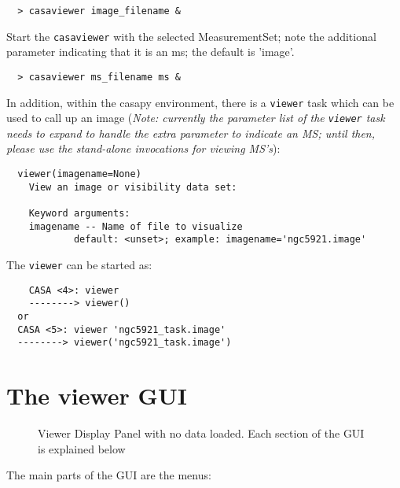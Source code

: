 \small
\begin{verbatim}
  > casaviewer image_filename &
\end{verbatim}
\normalsize

Start the {\tt casaviewer} with the selected MeasurementSet; note the
additional parameter indicating that it is an ms; the default is
'image'.

\small
\begin{verbatim}
  > casaviewer ms_filename ms &
\end{verbatim}
\normalsize

In addition, within the casapy environment, there is a {\tt viewer} task
which can be used to call up an image ({\it Note: currently the
parameter list of the {\tt viewer} task needs to expand to handle the
extra parameter to indicate an MS; until then, please use the
stand-alone invocations for viewing MS's}):

\small
\begin{verbatim}
  viewer(imagename=None)
    View an image or visibility data set:
    
    Keyword arguments:
    imagename -- Name of file to visualize
            default: <unset>; example: imagename='ngc5921.image'
\end{verbatim}
\normalsize


The {\tt viewer} can be started as:

\small
\begin{verbatim}
    CASA <4>: viewer
    --------> viewer()
  or
  CASA <5>: viewer 'ngc5921_task.image'
  --------> viewer('ngc5921_task.image')
\end{verbatim}
\normalsize

\section{The viewer GUI}
\label{section:viewer.GUI}

\begin{figure}[ht]
\caption{\label{fig:viewer0} Viewer Display Panel with no data
  loaded. Each section of the GUI is explained below} 
\hrulefill
\end{figure}
 
The main parts of the GUI are the menus:

